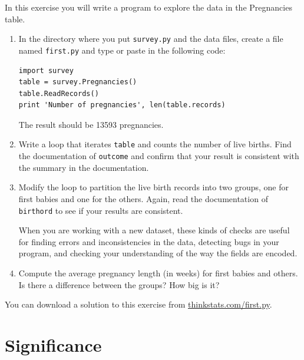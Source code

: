 \documentclass[12pt]{book}
\begin{document}
\begin{ex}

In this exercise you will write a program to explore the data
in the Pregnancies table.

\begin{enumerate}


\item In the directory where you put {\tt survey.py} and the
data files, create a file named \verb"first.py" and
type or paste in the following code:

\begin{verbatim}
import survey
table = survey.Pregnancies()
table.ReadRecords()
print 'Number of pregnancies', len(table.records)
\end{verbatim}

The result should be 13593 pregnancies.

\item Write a loop that iterates \verb"table" and counts
the number of live births.  Find the documentation of {\tt outcome}
and confirm that your result is consistent with the summary
in the documentation.

\item Modify the loop to partition the live birth records into
two groups, one for first babies and one for the others.  Again,
read the documentation of {\tt birthord} to see if your results
are consistent.

When you are working with a new dataset, these kinds of checks
are useful for finding errors and inconsistencies in the data,
detecting bugs in your program, and checking your understanding
of the way the fields are encoded.

\item Compute the average pregnancy length (in weeks) for first
babies and others.  Is there a difference between the groups?  How
big is it?


\end{enumerate}

You can download a solution to this exercise from
\url{thinkstats.com/first.py}.


\end{ex}


\section{Significance}
\end{document}
